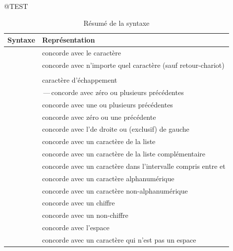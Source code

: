 \documentclass[a4paper,10pt,twoside]{book}
\begin{document}
\begin{code}{@TEST}
\begin{table}
\centering
	\begin{tabular}{lp{8cm}}
		\toprule
		Syntaxe \pkgregex & Représentation \\
		\midrule
		\lct{a}				&	concorde avec le caractère \lct{a} \\
		\lct{.}				&	concorde avec n'importe quel caractère (sauf retour-chariot) \\
		\lct{($\cdots$)}		&	\arevoir{sous-expression groupée} \\ %
		\lct{{\escape}}	&	caractère d'échappement \\ %
		\midrule
		\lct{*}				&	\kleenestar\,---\,concorde avec zéro ou plusieurs \expregs précédentes \\
		\lct{+}				&	concorde avec une ou plusieurs \expregs précédentes \\
		\lct{?}				&	concorde avec zéro ou une \expreg précédente \\
		\lct{|}				&	concorde avec l'\expreg de droite ou (exclusif) de gauche \\
		\midrule
		\lct{[abcd]}		&	concorde avec un caractère de la liste \lct{abcd} \\ %
		\lct{[{\caret}abcd]}	&	concorde avec un caractère de la liste complémentaire \\%
		\lct{[0-9]}		&	concorde avec un caractère dans l'intervalle compris entre \lct{0} et \lct{9} \\
		\midrule
		\lct{{\escape}w}			&	concorde avec un caractère alphanumérique \\
		\lct{{\escape}W}			&	concorde avec un caractère non-alphanumérique \\
		\lct{{\escape}d}			&	concorde avec un chiffre \\
		\lct{{\escape}D}			&	concorde avec un non-chiffre \\
		\lct{{\escape}s}			&	concorde avec l'espace \\
		\lct{{\escape}S}			&	concorde avec un caractère qui n'est pas un espace \\
		\bottomrule
	\end{tabular}
	\caption{Résumé de la syntaxe }
\end{table}



\end{code}
\end{document}
